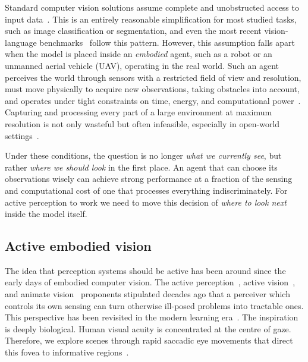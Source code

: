 Standard computer vision solutions assume complete and unobstructed access to input data~\cite{girdhar2022omnivore}. This is an entirely reasonable simplification for most studied tasks,
such as image classification or segmentation, and even the most recent vision-language benchmarks~\cite{chen2024we,yue2025mmmu} follow this pattern.
However, this assumption falls apart when the model is placed inside an \emph{embodied} agent, such as a robot or an unmanned aerial vehicle (UAV), operating in the real world.
Such an agent perceives the world through sensors with a restricted field of view and resolution, must move physically to acquire new observations, taking obstacles into account, and
operates under tight constraints on time, energy, and computational power~\cite{wenzel2021four}. Capturing and processing every part of a large environment at maximum resolution is not only wasteful but often infeasible, especially in open-world settings~\cite{mnih2014recurrent,sandini2003retina,ramakrishnan2021exploration}.

Under these conditions, the question is no longer \emph{what we currently see}, but rather \emph{where we should look} in the first
place. An agent that can choose its observations wisely can achieve strong performance at a fraction of the sensing and computational cost of one that
processes everything indiscriminately. For active perception to work we need to move this decision of \emph{where to look next} inside the model itself.

\subsection{Active embodied vision}

The idea that perception systems should be active has been around since the early days of embodied computer vision.
The active perception~\cite{bajcsy1988active}, active vision~\cite{aloimonos1988active}, and animate vision~\cite{ballard1991animate} proponents stipulated decades ago that a perceiver which controls its own sensing can turn otherwise ill-posed problems into tractable ones. This perspective has been revisited in the modern learning era~\cite{bajcsy2018revisiting}. The inspiration is deeply biological. Human visual acuity is concentrated at the centre of gaze. Therefore, we
explore scenes through rapid saccadic eye movements that direct this fovea to informative regions~\cite{yarbus1967eye,hayhoe2005eye}.

